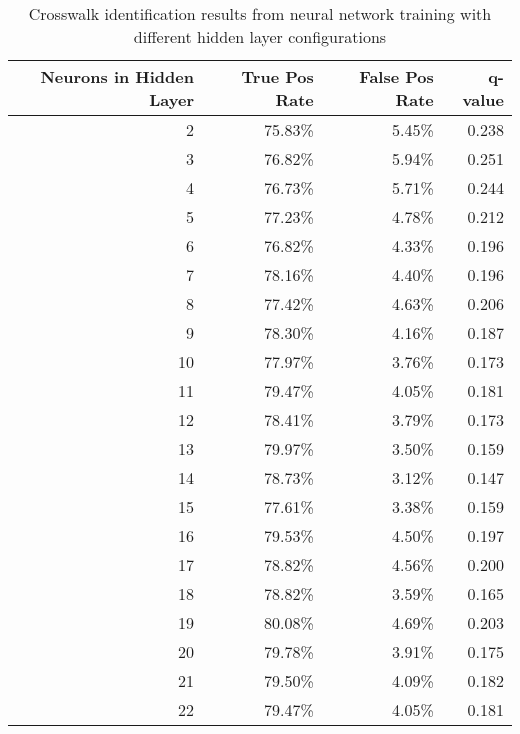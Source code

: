 \chapter{ }
    \begin{longtable}{|r|r|r|r|}
    \caption{Crosswalk identification results from neural network training with different hidden layer configurations}
    \label{tab:NN-HiddenLayersResultsAPP}\\
    \hline
    Neurons in Hidden Layer & True Pos Rate & False Pos Rate & q-value \bigstrut\\
    \hline
    2     & 75.83\% & 5.45\% & 0.238 \bigstrut\\
    \hline
    3     & 76.82\% & 5.94\% & 0.251 \bigstrut\\
    \hline
    4     & 76.73\% & 5.71\% & 0.244 \bigstrut\\
    \hline
    5     & 77.23\% & 4.78\% & 0.212 \bigstrut\\
    \hline
    6     & 76.82\% & 4.33\% & 0.196 \bigstrut\\
    \hline
    7     & 78.16\% & 4.40\% & 0.196 \bigstrut\\
    \hline
    8     & 77.42\% & 4.63\% & 0.206 \bigstrut\\
    \hline
    9     & 78.30\% & 4.16\% & 0.187 \bigstrut\\
    \hline
    10    & 77.97\% & 3.76\% & 0.173 \bigstrut\\
    \hline
    11    & 79.47\% & 4.05\% & 0.181 \bigstrut\\
    \hline
    12    & 78.41\% & 3.79\% & 0.173 \bigstrut\\
    \hline
    13    & 79.97\% & 3.50\% & 0.159 \bigstrut\\
    \hline
    14    & 78.73\% & 3.12\% & 0.147 \bigstrut\\
    \hline
    15    & 77.61\% & 3.38\% & 0.159 \bigstrut\\
    \hline
    16    & 79.53\% & 4.50\% & 0.197 \bigstrut\\
    \hline
    17    & 78.82\% & 4.56\% & 0.200 \bigstrut\\
    \hline
    18    & 78.82\% & 3.59\% & 0.165 \bigstrut\\
    \hline
    19    & 80.08\% & 4.69\% & 0.203 \bigstrut\\
    \hline
    20    & 79.78\% & 3.91\% & 0.175 \bigstrut\\
    \hline
    21    & 79.50\% & 4.09\% & 0.182 \bigstrut\\
    \hline
    22    & 79.47\% & 4.05\% & 0.181 \bigstrut\\
    \hline
    \end{longtable}




